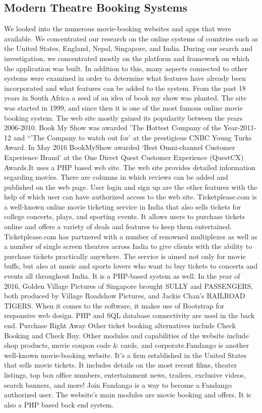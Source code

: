 \documentclass[12pt]{article}
\begin{document}
\subsection{Modern Theatre Booking Systems}
We looked into the numerous movie-booking websites and apps that were available. We concentrated our research on the online systems of countries such as the United States, England, Nepal, Singapore, and India. During our search and investigation, we concentrated mostly on the platform and framework on which the application was built. In addition to this, many aspects connected to other systems were examined in order to determine what features have already been incorporated and what features can be added to the system. From the past 18 years in South Africa a seed of an idea of book my show was planted. The site was started in 1999, and since then it is one of the most famous online movie booking system. The web site mostly gained its popularity between the years 2006-2010. Book My Show was awarded 'The Hottest Company of the Year-2011-12 and “'The Company to watch out for' at the prestigious CNBC Young Turks Award. In May 2016 BookMyShow awarded ‘Best Omni-channel Customer Experience Brand’ at the One Direct Quest Customer Experience (QuestCX) Awards.It uses a PHP based web site. The web site provides detailed information regarding movies. There are columns in which reviews can be added and published on the web page. User login and sign up are the other features with the help of which user can have authorized access to the web site. Ticketplease.com is a well-known online movie ticketing service in India that also sells tickets for college concerts, plays, and sporting events. It allows users to purchase tickets online and offers a variety of deals and features to keep them entertained. Ticketplease.com has partnered with a number of renowned multiplexes as well as a number of single screen theatres across India to give clients with the ability to purchase tickets practically anywhere. The service is aimed not only for movie buffs, but also at music and sports lovers who want to buy tickets to concerts and events all throughout India. It is a PHP-based system as well. In the year of 2016, Golden Village Pictures of Singapore brought SULLY and PASSENGERS, both produced by Village Roadshow Pictures, and Jackie Chan’s RAILROAD TIGERS. When it comes to the software, it makes use of Bootstrap for responsive web design. PHP and SQL database connectivity are used in the back end. Purchase Right Away Other ticket booking alternatives include Check Booking and Check Buy. Other modules and capabilities of the website include shop products, movie coupon code & cards, and corporate.Fandango is another well-known movie-booking website. It's a firm established in the United States that sells movie tickets. It includes details on the most recent films, theater listings, top box office numbers, entertainment news, trailers, exclusive videos, search banners, and more! Join Fandango is a way to become a Fandango authorized user. The website's main modules are movie booking and offers. It is also a PHP based back end system.
\end{document}
